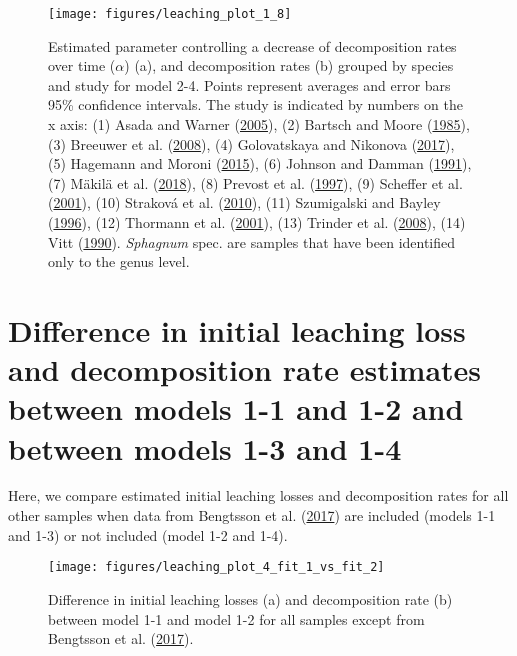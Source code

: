 \documentclass[
  12pt,
]{article}
\begin{document}
\begin{figure}[H]

{\centering \texttt{[image: figures/leaching\_plot\_1\_8]} 

}

\caption{Estimated parameter controlling a decrease of decomposition rates over time (\(\alpha\)) (a), and decomposition rates (b) grouped by species and study for model 2-4. Points represent averages and error bars 95\% confidence intervals. The study is indicated by numbers on the x axis: (1) Asada and Warner (\protect\hyperlink{ref-Asada.2005b}{2005}), (2) Bartsch and Moore (\protect\hyperlink{ref-Bartsch.1985}{1985}), (3) Breeuwer et al. (\protect\hyperlink{ref-Breeuwer.2008}{2008}), (4) Golovatskaya and Nikonova (\protect\hyperlink{ref-Golovatskaya.2017}{2017}), (5) Hagemann and Moroni (\protect\hyperlink{ref-Hagemann.2015}{2015}), (6) Johnson and Damman (\protect\hyperlink{ref-Johnson.1991}{1991}), (7) Mäkilä et al. (\protect\hyperlink{ref-Makila.2018}{2018}), (8) Prevost et al. (\protect\hyperlink{ref-Prevost.1997}{1997}), (9) Scheffer et al. (\protect\hyperlink{ref-Scheffer.2001}{2001}), (10) Straková et al. (\protect\hyperlink{ref-Strakova.2010}{2010}), (11) Szumigalski and Bayley (\protect\hyperlink{ref-Szumigalski.1996}{1996}), (12) Thormann et al. (\protect\hyperlink{ref-Thormann.2001}{2001}), (13) Trinder et al. (\protect\hyperlink{ref-Trinder.2008}{2008}), (14) Vitt (\protect\hyperlink{ref-Vitt.1990}{1990}). \emph{Sphagnum} spec. are samples that have been identified only to the genus level.}\label{fig:sup-out-mm35-2-p5}
\end{figure}

\hypertarget{sup-3}{%
\section{Difference in initial leaching loss and decomposition rate estimates between models 1-1 and 1-2 and between models 1-3 and 1-4}\label{sup-3}}

Here, we compare estimated initial leaching losses and decomposition rates for all other samples when data from Bengtsson et al. (\protect\hyperlink{ref-Bengtsson.2017}{2017}) are included (models 1-1 and 1-3) or not included (model 1-2 and 1-4).



\begin{figure}[H]

{\centering \texttt{[image: figures/leaching\_plot\_4\_fit\_1\_vs\_fit\_2]} 

}

\caption{Difference in initial leaching losses (a) and decomposition rate (b) between model 1-1 and model 1-2 for all samples except from Bengtsson et al. (\protect\hyperlink{ref-Bengtsson.2017}{2017}).}\label{fig:sup-out-sdm-mm27-1-mm27-2-parameter-difference-p1-1}
\end{figure}
\end{document}
